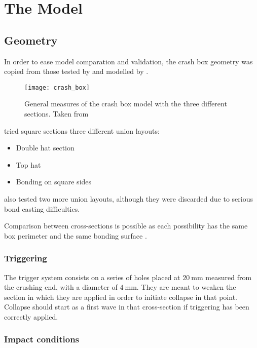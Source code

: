 \chapter{The Model}
\label{model}

\section{Geometry}

In order to ease model comparation and validation, the crash box geometry was copied from those tested by \citet{Peroni2009} and modelled by \citet{Scattina2011}.

\begin{figure}
\centering
\texttt{[image: crash\_box]}
\caption{General measures of the crash box model with the three different sections. Taken from \citet{Peroni2009}}
\label{fig:damage_evo2D}
\end{figure}

\citet{Scattina2011} tried square sections three different union layouts:
\begin{itemize}
\item Double hat section \citep{Lee2006, Yang2012, Yamashita2013}
\item Top hat \citep{Yamashita2013}
\item Bonding on square sides
\end{itemize}
\citet{Peroni2009} also tested two more union layouts, although they were discarded due to serious bond casting difficulties.

Comparison between cross-sections is possible as each possibility has the same box perimeter and the same bonding surface \citep{Peroni2009}.

\subsection{Triggering}

The trigger system consists on a series of holes placed at $\SI{20}{\mm}$ measured from the crushing end, with a diameter of $\SI{4}{\mm}$. They are meant to weaken the section in which they are applied in order to initiate collapse in that point. Collapse should start as a first wave in that cross-section if triggering has been correctly applied.


\subsection{Impact conditions}  %

